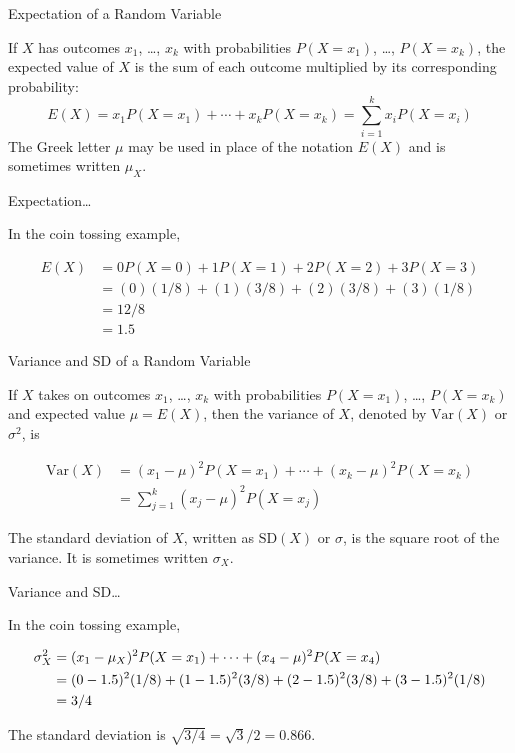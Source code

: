 \documentclass[ignorenonframetext,aspectratio=169]{beamer}
\begin{document}
\begin{frame}{Expectation of a Random Variable}

If \(X\) has outcomes \(x_1\), \ldots{}, \(x_k\) with probabilities
\(P(X=x_1)\), \ldots{}, \(P(X=x_k)\), the expected value of \(X\) is the
sum of each outcome multiplied by its corresponding probability:
\[E(X)  = x_1 P(X=x_1) + \cdots + x_k P(X=x_k) = \sum_{i=1}^{k}x_iP(X=x_i)\]
The Greek letter \(\mu\) may be used in place of the notation \(E(X)\)
and is sometimes written \(\mu_X\).

\end{frame}

\begin{frame}{Expectation\ldots{}}

In the coin tossing example,

\begin{align*}
E(X) &= 0P(X=0) + 1P(X=1) + 2P(X=2) + 3P(X = 3)  \\
    &= (0)(1/8) + (1)(3/8) + (2)(3/8) + (3)(1/8)  \\
    &= 12/8  \\
    &= 1.5 
\end{align*}

\end{frame}

\begin{frame}{Variance and SD of a Random Variable}

If \(X\) takes on outcomes \(x_1\), \ldots{}, \(x_k\) with probabilities
\(P(X=x_1)\), \ldots{}, \(P(X=x_k)\) and expected value \(\mu=E(X)\),
then the variance of \(X\), denoted by \(\text{Var}(X)\) or
\(\sigma^2\), is

\begin{align*}
\text{Var}(X) &= (x_1-\mu)^2 P(X=x_1) + \cdots+ (x_k-\mu)^2 P(X=x_k) \\
    &= \sum_{j=1}^{k} (x_j - \mu)^2 P(X=x_j)
\end{align*}

The standard deviation of \(X\), written as \(\text{SD}(X)\) or
\(\sigma\), is the square root of the variance. It is sometimes written
\(\sigma_X\).

\end{frame}

\begin{frame}{Variance and SD\ldots{}}

In the coin tossing example,

\begin{align}
    \sigma_X^2 &= (x_1-\mu_X)^2P(X=x_1) + \cdots+ (x_4-\mu)^2 P(X=x_4) \notag \\
        &= (0- 1.5)^2(1/8) + (1 - 1.5)^2 (3/8) + (2 -1.5)^2 (3/8) + (3-1.5)^2 (1/8) \notag  \\
        &= 3/4 \notag
    \end{align}

The standard deviation is \(\sqrt{3/4} = \sqrt{3}/2 = 0.866\).

\end{frame}
\end{document}
